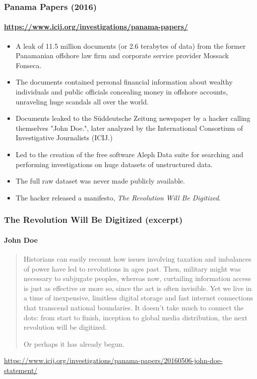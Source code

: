 \documentclass[aspectratio=169,usenames,dvipsnames]{beamer}
\begin{document}
\begin{frame}
  \frametitle{Panama Papers (2016)}
  \framesubtitle{\url{https://www.icij.org/investigations/panama-papers/}}

  \begin{itemize}[<+->]
    \item A leak of 11.5 million documents (or 2.6 terabytes of data) from the
      former Panamanian offshore law firm and corporate service provider
      Mossack Fonseca.
    \item The documents contained personal financial information about wealthy
      individuals and public officials concealing money in offshore accounts,
      unraveling huge scandals all over the world.
    \item Documents leaked to the Süddeutsche Zeitung newspaper by a hacker
      calling themselves "John Doe.", later analyzed by the International
      Consortium of Investigative Journalists (ICIJ.)
    \item Led to the creation of the free software Aleph Data suite for
      searching and performing investigations on huge datasets of unstructured
      data.
    \item The full raw dataset was never made publicly available.
    \item The hacker released a manifesto, \emph{The Revolution Will Be
      Digitized}.
  \end{itemize}

\end{frame}

\begin{frame}
  \frametitle{The Revolution Will Be Digitized (excerpt)}
  \framesubtitle{John Doe}

  \begin{quote}
    Historians can easily recount how issues involving taxation and imbalances
    of power have led to revolutions in ages past. Then, military might was
    necessary to subjugate peoples, whereas now, curtailing information access
    is just as effective or more so, since the act is often invisible. Yet we
    live in a time of inexpensive, limitless digital storage and fast internet
    connections that transcend national boundaries. It doesn’t take much to
    connect the dots: from start to finish, inception to global media
    distribution, the next revolution will be digitized.

    \pause
    \vspace{3mm}
    Or perhaps it has already begun.
  \end{quote}

  \vspace{3mm}
  \centering
  \footnotesize
  \url{https://www.icij.org/investigations/panama-papers/20160506-john-doe-statement/}

\end{frame}
\end{document}
